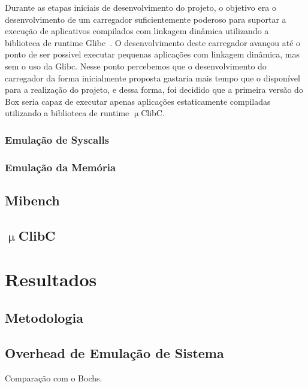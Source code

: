 \documentclass[11pt,twoside]{article}
\begin{document}
Durante as etapas iniciais de desenvolvimento do projeto, o objetivo era
o desenvolvimento de um carregador suficientemente poderoso para suportar
a execução de aplicativos compilados com linkagem dinâmica utilizando a
biblioteca de runtime Glibc~\cite{glibc}. O desenvolvimento deste carregador
avançou até o ponto de ser possivel executar pequenas aplicações com linkagem
dinâmica, mas sem o uso da Glibc. Nesse ponto percebemos que o desenvolvimento
do carregador da forma inicialmente proposta gastaria mais tempo que o 
disponível para a realização do projeto, e dessa forma, foi decidido que
a primeira versão do Box seria capaz de executar apenas aplicações 
estaticamente compiladas utilizando a biblioteca de runtime $\upmu$ClibC.




\subsubsection{Emulação de Syscalls}

\subsubsection{Emulação da Memória}

\subsection{Mibench}

\subsection{$\upmu$ClibC}





\section{Resultados} \label{sec:resultados}

\subsection{Metodologia}

\subsection{Overhead de Emulação de Sistema}

Comparação com o Bochs.
\end{document}
